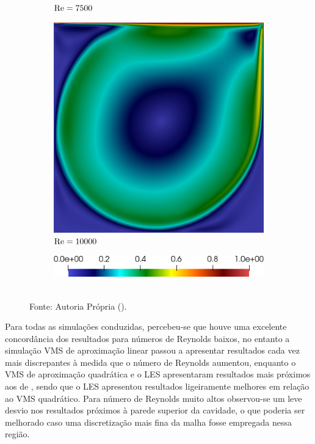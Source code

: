 \begin{figure}[h]
\begin{subfigure}{0.32\textwidth}
    \caption{$\mathrm{Re}=7500$}
    \end{subfigure}
    \begin{subfigure}{0.32\textwidth}
    \includegraphics[width=\linewidth]{Figuras/Cavity/Re10000.png}
    \caption{$\mathrm{Re}=10000$}
    \end{subfigure}
    \begin{subfigure}{0.4\textwidth}
    \includegraphics[width=\linewidth]{Figuras/Cavity/Legenda.png}
    \end{subfigure}
    \\Fonte: Autoria Própria (\the\year).
    \label{fig:cavity-results2}
\end{figure}

Para todas as simulações conduzidas, percebeu-se que houve uma excelente concordância dos resultados para números de Reynolds baixos, no entanto a simulação VMS de aproximação linear passou a apresentar resultados cada vez mais discrepantes à medida que o número de Reynolds aumentou, enquanto o VMS de aproximação quadrática e o LES apresentaram resultados mais próximos aos de , sendo que o LES apresentou resultados ligeiramente melhores em relação ao VMS quadrático. Para número de Reynolds muito altos observou-se um leve desvio nos resultados próximos à parede superior da cavidade, o que poderia ser melhorado caso uma discretização mais fina da malha fosse empregada nessa região.